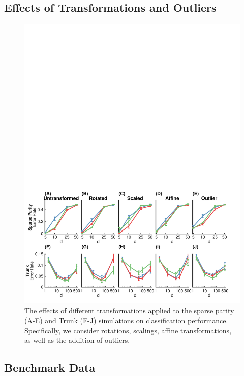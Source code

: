 \documentclass{article}
\begin{document}
\subsection{Effects of Transformations and Outliers}

\begin{figure}[ht]
\vskip 0.2in
\begin{center}
\centerline{\includegraphics[width=\columnwidth]{../Figures/pdf/Fig3_transformations2}}
\caption{The effects of different transformations applied to the sparse parity (A-E) and Trunk (F-J) simulations on classification performance. Specifically, we consider rotations, scalings, affine transformations, as well as the addition of outliers.}
\label{transformations}
\end{center}
\vskip -0.2in
\end{figure}

\subsection{Benchmark Data}
\end{document}
